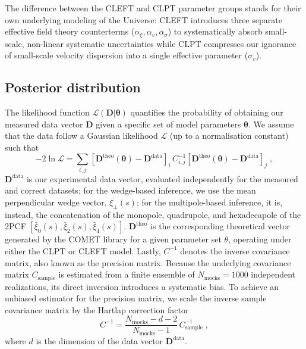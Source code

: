 \documentclass[12pt,a4paper,oneside]{report}
\begin{document}
The difference between the CLEFT and CLPT parameter groups stands for their own underlying modeling of the Universe: CLEFT introduces three separate effective field theory counterterms ($\alpha_\xi, \alpha_v, \alpha_\sigma$) to systematically absorb small-scale, non-linear systematic uncertainties while CLPT compresses our ignorance of small-scale velocity dispersion into a single effective parameter ($\sigma_v$).

\subsection{Posterior distribution}\label{subsec:Posterior}
The likelihood function $\mathcal{L}(\mathbf{D}|\boldsymbol{\theta})$ quantifies the probability of obtaining our measured data vector $\mathbf{D}$ given a specific set of model parameters $\boldsymbol{\theta}$. We assume that the data follow a Gaussian likelihood $\mathcal{L}$ (up to a normalisation constant) such that
\begin{equation}
  -2 \ln \mathcal{L} = \sum_{i,j} [\mathbf{D}^{\mathrm{theo}}(\boldsymbol{\theta}) - \mathbf{D}^{\mathrm{data}}]_i \, C_{i,j}^{-1} [\mathbf{D}^{\mathrm{theo}}(\boldsymbol{\theta}) - \mathbf{D}^{\mathrm{data}}]_j \; ,
  \label{eq:Posterior}
\end{equation}
$\mathbf{D}^\mathrm{data}$ is our experimental data vector, evaluated independently for the measured and correct datasets; for the wedge-based inference, we use the mean perpendicular wedge vector, $\bar{\xi_\perp} (s)$; for the multipole-based inference, it is, instead, the concatenation of the monopole, quadrupole, and hexadecapole of the 2PCF $[\bar{\xi}_0(s), \bar{\xi}_2(s), \bar{\xi}_4(s)]$. $\mathbf{D}^\mathrm{theo}$ is the corresponding theoretical vector generated by the COMET library for a given parameter set $\theta$, operating under either the CLPT or CLEFT model. Lastly, $C^{-1}$ denotes the inverse covariance matrix, also known as the precision matrix. Because the underlying covariance matrix $C_{\mathrm{sample}}$ is estimated from a finite ensemble of $N_{\mathrm{mocks}} = 1000$ independent realizations, its direct inversion introduces a systematic bias. To achieve an unbiased estimator for the precision matrix, we scale the inverse sample covariance matrix by the Hartlap correction factor~\cite{Hartlap_2006}
\begin{equation}
  C^{-1} = \frac{N_{\mathrm{mocks}} - d - 2}{N_{\mathrm{mocks}} - 1} \, C_{\mathrm{sample}}^{-1} \; ,
  \label{eq:HartlapFactor}
\end{equation}
where $d$ is the dimension of the data vector $\mathbf{D}^{\mathrm{data}}$.
\end{document}
